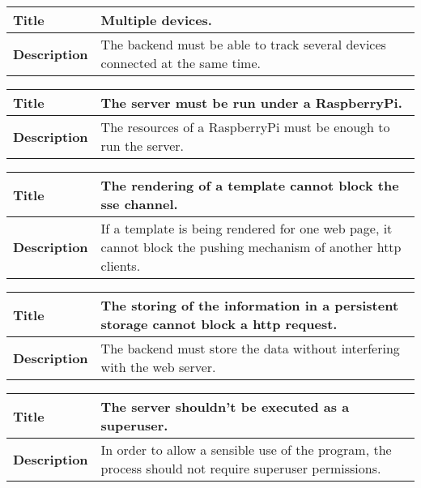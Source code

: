 \documentclass[12pt]{article}
\begin{document}
                \begin{tabularx}{\textwidth}{|l|X|}
                    \hline
                    \textbf{Title} & Multiple devices. \\
                    \hline
                    \textbf{Description} & The backend must be able to track
                    several devices connected at the same time. \\
                    \hline
                \end{tabularx}

                \begin{tabularx}{\textwidth}{|l|X|}
                    \hline
                    \textbf{Title} & The server must be run under a RaspberryPi.\\
                    \hline
                    \textbf{Description} & The resources of a RaspberryPi must
                    be enough to run the server. \\
                    \hline
                \end{tabularx}

                \begin{tabularx}{\textwidth}{|l|X|}
                    \hline
                    \textbf{Title} & The rendering of a template cannot block
                    the sse channel. \\
                    \hline
                    \textbf{Description} & If a template is being rendered for
                    one web page, it cannot block the pushing mechanism of
                    another http clients. \\
                    \hline
                \end{tabularx}

                \begin{tabularx}{\textwidth}{|l|X|}
                    \hline
                    \textbf{Title} & The storing of the information in a
                    persistent storage cannot block a http request. \\
                    \hline
                    \textbf{Description} & The backend must store the data
                    without interfering with the web server. \\
                    \hline
                \end{tabularx}

                \begin{tabularx}{\textwidth}{|l|X|}
                    \hline
                    \textbf{Title} & The server shouldn't be executed as a
                    superuser. \\
                    \hline
                    \textbf{Description} & In order to allow a sensible use of
                    the program, the process should not require superuser
                    permissions. \\
                    \hline
                \end{tabularx}
\end{document}
